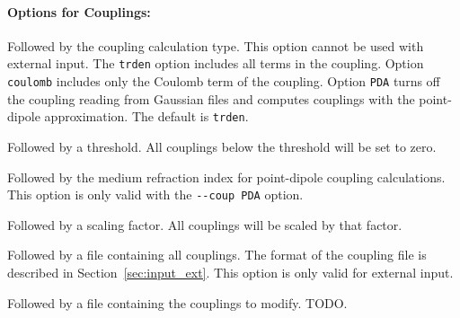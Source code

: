 \documentclass[a4paper,11pt]{article}
\begin{document}
\paragraph*{Options for Couplings:}
\begin{description}[labelsep=10pt, align=left, labelwidth=80pt,labelindent=0pt,leftmargin=90pt]
\item[\texttt{-{}-coup}] Followed by the coupling calculation type. This option cannot be used with external input. The \texttt{trden} option includes all terms in the coupling. Option \texttt{coulomb} includes only the Coulomb term of the coupling. Option \texttt{PDA} turns off the coupling reading from Gaussian files and computes couplings with the point-dipole approximation. The default is \texttt{trden}.
\item[\texttt{-{}-cleancoup}] Followed by a threshold. All couplings below the threshold will be set to zero.
\item[\texttt{-{}-refrind}] Followed by the medium refraction index for point-dipole coupling calculations. This option is only valid with the \texttt{-{}-coup PDA} option.
\item[\texttt{-{}-scalecoup}] Followed by a scaling factor. All couplings will be scaled by that factor. 
\item[\texttt{-{}-incoup}] Followed by a file containing all couplings. The format of the coupling file is described in Section~\ref{sec:input_ext}. This option is only valid for external input.
\item[\texttt{-{}-modcoup}] Followed by a file containing the couplings to modify. TODO. 

\end{description}
\end{document}
